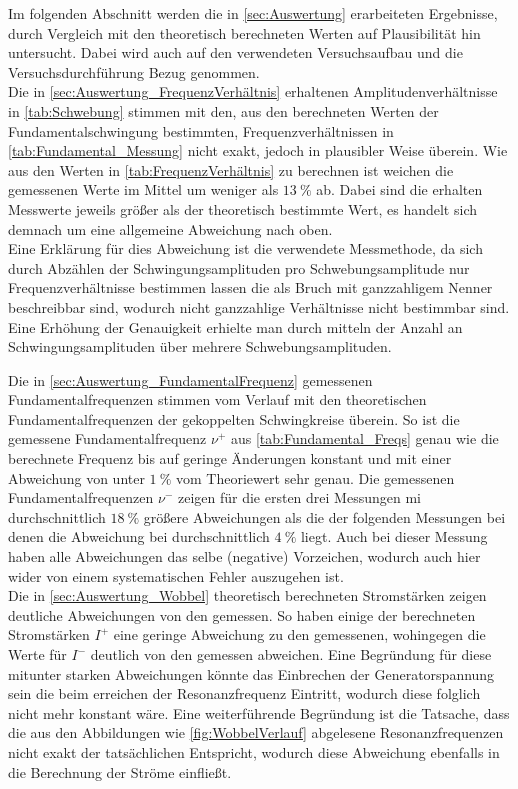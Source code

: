 Im folgenden Abschnitt werden die in \cref{sec:Auswertung} erarbeiteten Ergebnisse,
durch Vergleich mit den theoretisch berechneten Werten auf 
Plausibilität hin untersucht. Dabei wird auch auf den verwendeten Versuchsaufbau und die 
Versuchsdurchführung Bezug genommen.\\

Die in \cref{sec:Auswertung_FrequenzVerhältnis} erhaltenen Amplitudenverhältnisse in \cref{tab:Schwebung} 
stimmen mit den, aus den berechneten Werten der Fundamentalschwingung bestimmten, Frequenzverhältnissen
in \cref{tab:Fundamental_Messung} nicht exakt, jedoch in plausibler Weise überein. Wie aus den Werten in 
\cref{tab:FrequenzVerhältnis} zu berechnen ist weichen die gemessenen Werte im Mittel um weniger als
$\SI{13}{\percent}$ ab. Dabei sind die erhalten Messwerte jeweils größer als der theoretisch bestimmte 
Wert, es handelt sich demnach um eine allgemeine Abweichung nach oben.\\
Eine Erklärung für dies Abweichung ist die verwendete Messmethode, da sich durch Abzählen der Schwingungsamplituden
pro Schwebungsamplitude nur Frequenzverhältnisse bestimmen lassen die als Bruch mit ganzzahligem Nenner beschreibbar
sind, wodurch nicht ganzzahlige Verhältnisse nicht bestimmbar sind. Eine Erhöhung der Genauigkeit erhielte man durch 
mitteln der Anzahl an Schwingungsamplituden über mehrere Schwebungsamplituden.   
     
Die in \cref{sec:Auswertung_FundamentalFrequenz} gemessenen Fundamentalfrequenzen stimmen vom Verlauf mit den 
theoretischen Fundamentalfrequenzen der gekoppelten Schwingkreise überein. So ist die gemessene Fundamentalfrequenz
$\nu^{+}$  aus \cref{tab:Fundamental_Freqs} genau wie die berechnete Frequenz bis auf geringe Änderungen 
konstant und mit einer Abweichung von unter $\SI{1}{\percent}$ vom Theoriewert sehr genau. 
Die gemessenen Fundamentalfrequenzen $\nu^{-}$ zeigen für die ersten drei Messungen mi durchschnittlich $\SI{18}{\percent}$
größere Abweichungen als die der folgenden Messungen bei denen die Abweichung bei durchschnittlich $\SI{4}{\percent}$
liegt. Auch bei dieser Messung haben alle Abweichungen das selbe (negative) Vorzeichen, wodurch auch hier wider
von einem systematischen Fehler auszugehen ist.\\
Die in \cref{sec:Auswertung_Wobbel} theoretisch berechneten Stromstärken zeigen deutliche Abweichungen von den
gemessen. So haben einige der berechneten Stromstärken $I^{+}$ eine geringe Abweichung zu den gemessenen,
wohingegen die Werte für $I^{-}$ deutlich von den gemessen abweichen. Eine Begründung für diese mitunter
starken Abweichungen könnte das Einbrechen der Generatorspannung sein die beim erreichen der Resonanzfrequenz
Eintritt, wodurch diese folglich nicht mehr konstant wäre. Eine weiterführende Begründung ist die Tatsache, dass
die aus den Abbildungen wie \ref{fig:WobbelVerlauf} abgelesene Resonanzfrequenzen nicht exakt der 
tatsächlichen Entspricht, wodurch diese Abweichung ebenfalls in die Berechnung der Ströme einfließt.

              
